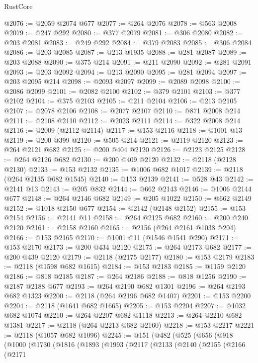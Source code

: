 \begin{lexlean}{RustCore}
\begin{coremodule}
@2076 := @2059 @2074 @677
@2077 := @264 @2076
@2078 := @563 @2008
@2079 := @247 @292
@2080 := @377 @2079
@2081 := @306 @2080
@2082 := @203 @2081
@2083 := @249 @292
@2084 := @379 @2083
@2085 := @306 @2084
@2086 := @203 @2085
@2087 := @213 @1935
@2088 := @281 @2087
@2089 := @203 @2088
@2090 := @375 @214
@2091 := @211 @2090
@2092 := @281 @2091
@2093 := @203 @2092
@2094 := @213 @2090
@2095 := @281 @2094
@2097 := @203 @2095 @214
@2098 := @2093 @2097
@2099 := @2089 @2098
@2100 := @2086 @2099
@2101 := @2082 @2100
@2102 := @379 @2101
@2103 := @377 @2102
@2104 := @375 @2103
@2105 := @211 @2104
@2106 := @213 @2105
@2107 := @2078 @2106
@2108 := @2077 @2107
@2110 := @871 @2008 @214
@2111 := @2108 @2110
@2112 := @2023 @2111
@2114 := @322 @2008 @214
@2116 := @2009 (@2112 @2114)
@2117 := @153 @2116
@2118 := @1001 @13
@2119 := @200 @399
@2120 := @505 @214
@2121 := @2119 @2120
@2123 := @264 @2121 @682
@2125 := @200 @404 @2120
@2126 := @2123 @2125
@2128 := @264 @2126 @682
@2130 := @200 @409 @2120
@2132 := @2118 (@2128 @2130)
@2133 := @153 @2132
@2135 := @1006 @682 @1017
@2139 := @2118 (@264 @2135 @682 @1545)
@2140 := @153 @2139
@2141 := @528 @43
@2142 := @2141 @13
@2143 := @205 @832
@2144 := @662 @2143
@2146 := @1006 @2144 @677
@2148 := @264 @2146 @682
@2149 := @205 @1022
@2150 := @662 @2149
@2152 := @1018 @2150 @677
@2154 := @2142 (@2148 @2152)
@2155 := @153 @2154
@2156 := @2141 @11
@2158 := @264 @2125 @682
@2160 := @200 @240 @2120
@2161 := @2158 @2160
@2165 := @2156 (@264 @2161 @1038 @204)
@2166 := @153 @2165
@2170 := @1001 @11 (@1546 @1541 @290)
@2171 := @153 @2170
@2173 := @200 @434 @2120
@2175 := @264 @2173 @682
@2177 := @200 @439 @2120
@2179 := @2118 (@2175 @2177)
@2180 := @153 @2179
@2183 := @2118 (@1598 @682 @1615)
@2184 := @153 @2183
@2185 := @1159 @2120
@2186 := @818 @2185
@2187 := @264 @2186
@2188 := @818 @1256
@2190 := @2187 @2188 @677
@2193 := @264 @2190 @682 @1301
@2196 := @264 @2193 @682 @1323
@2200 := @2118 (@264 @2196 @682 @1407)
@2201 := @153 @2200
@2204 := @2118 (@1641 @682 @1665)
@2205 := @153 @2204
@2207 := @1032 @682 @1074
@2210 := @264 @2207 @682 @1118
@2213 := @264 @2210 @682 @1381
@2217 := @2118 (@264 @2213 @682 @2160)
@2218 := @153 @2217
@2221 := @2118 (@1057 @682 @1096)
@2245 := @151
    (@482
      (@525
        (@656
          (@918
            (@1000
              (@1730
                (@1816
                  (@1893
                    (@1993
                      (@2117
                        (@2133
                          (@2140
                            (@2155
                              (@2166
                                (@2171

\end{coremodule}
\end{lexlean}

